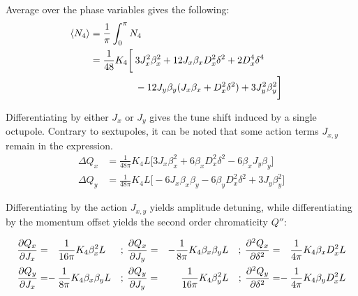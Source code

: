 Average over the phase variables gives the following:
\begin{equation}
  \begin{aligned}
  \left< N_4 \right> &= \frac{1}{\pi} \int_0^\pi N_4 \\
                     &= \frac{1}{48} K_4 \biggl[&& \mkern-30mu 3 J_x^2\beta_x^2 
                                                 +12 J_x \beta_x D_x^2 \delta^2 
                                                 +2D_x^4 \delta^4 \\
                     &                          && \mkern-30mu -12 J_y \beta_y (J_x \beta_x + D^2_x\delta^2)
                                                 + 3 J_y^2 \beta_y^2
                                         \biggr]
  \end{aligned}
\end{equation}


Differentiating by either $J_x$ or $J_y$ gives the tune shift induced by a single octupole. Contrary
to sextupoles, it can be noted that some action terms $J_{x,y}$ remain in the expression. 
\begin{equation}\begin{aligned}
\Delta Q_x &= \frac{1}{48\pi} K_4 L \biggl[3 J_x \beta_x^2
                                                                                                             +6 \beta_x D_x^2 \delta^2
                                                                                                             -6 \beta_x J_y  \beta_y 
                                                                                                      \biggr]\\
\Delta Q_y &= \frac{1}{48\pi} K_4 L \biggl[-6 J_x \beta_x \beta_y
                                                                                                             -6 \beta_y D_x^2 \delta^2
                                                                                                             +3 J_y \beta_y^2
                                                                                                      \biggr]
\end{aligned}\end{equation}


Differentiating by the action $J_{x,y}$ yields amplitude detuning, while differentiating by the 
momentum offset yields the second order chromaticity $Q''$:

\begin{equation}
  \begin{aligned}
  \frac{\partial Q_x}{\partial J_x} =& &&\frac{1}{16\pi} K_4 \beta_x^2L &&;\:
  \frac{\partial Q_x}{\partial J_y} =& -\frac{1}{8\pi} K_4 \beta_x\beta_yL &&;\:
  \frac{\partial^2 Q_x}{\partial \delta^2} =& &&\frac{1}{4\pi} K_4 \beta_x D_x^2L 
  \\
  \frac{\partial Q_y}{\partial J_x} =& -\mkern-18mu &&\frac{1}{8\pi} K_4 \beta_x \beta_yL &&;\:
  \frac{\partial Q_y}{\partial J_y} =& \frac{1}{16\pi} K_4 \beta_y^2L &&;\:
  \frac{\partial^2 Q_y}{\partial \delta^2} =& -\mkern-18mu &&\frac{1}{4\pi} K_4 \beta_y D_x^2L 
  \end{aligned}
\end{equation}

